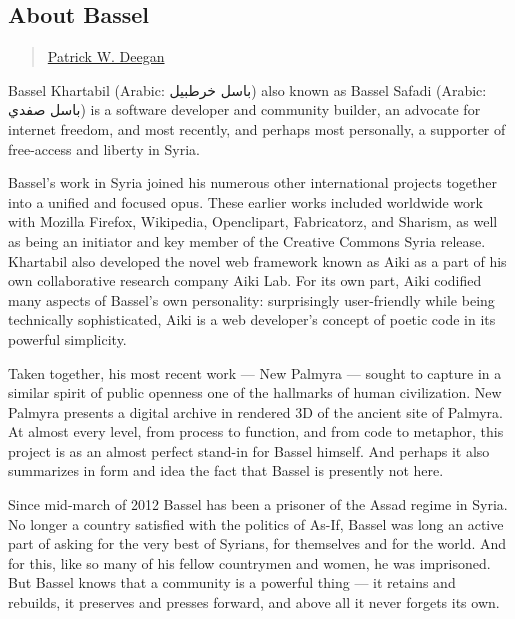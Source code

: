 \subsection{About Bassel}\label{about-bassel}

\begin{quote}
\href{../appendix/attributions.html\#patrick-w-deegan}{Patrick W.
Deegan}
\end{quote}

Bassel Khartabil (Arabic: باسل خرطبيل‎) also known as Bassel Safadi
(Arabic: باسل صفدي‎) is a software developer and community builder, an
advocate for internet freedom, and most recently, and perhaps most
personally, a supporter of free-access and liberty in Syria.

Bassel's work in Syria joined his numerous other international projects
together into a unified and focused opus. These earlier works included
worldwide work with Mozilla Firefox, Wikipedia, Openclipart,
Fabricatorz, and Sharism, as well as being an initiator and key member
of the Creative Commons Syria release. Khartabil also developed the
novel web framework known as Aiki as a part of his own collaborative
research company Aiki Lab. For its own part, Aiki codified many aspects
of Bassel's own personality: surprisingly user-friendly while being
technically sophisticated, Aiki is a web developer's concept of poetic
code in its powerful simplicity.

Taken together, his most recent work --- New Palmyra --- sought to
capture in a similar spirit of public openness one of the hallmarks of
human civilization. New Palmyra presents a digital archive in rendered
3D of the ancient site of Palmyra. At almost every level, from process
to function, and from code to metaphor, this project is as an almost
perfect stand-in for Bassel himself. And perhaps it also summarizes in
form and idea the fact that Bassel is presently not here.

Since mid-march of 2012 Bassel has been a prisoner of the Assad regime
in Syria. No longer a country satisfied with the politics of As-If,
Bassel was long an active part of asking for the very best of Syrians,
for themselves and for the world. And for this, like so many of his
fellow countrymen and women, he was imprisoned. But Bassel knows that a
community is a powerful thing --- it retains and rebuilds, it preserves
and presses forward, and above all it never forgets its own.
